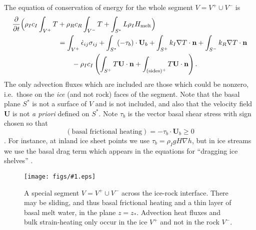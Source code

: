 \documentclass[12pt,final]{amsart}%
\theoremstyle{plain}
\theoremstyle{definition}
\theoremstyle{remark}
\newcommand{\regfigure}[2]{\texttt{[image: figs/\#1.eps]}}
\newcommand{\ddt}[1]{\ensuremath{\frac{\partial #1}{\partial t}}}
\def\eps{\epsilon}
\newcommand{\grad}{\nabla}
\newcommand{\nhat}{\mathbf{n}}
\newcommand{\bU}{{\mathbf{U}}}
\begin{document}
The equation of conservation of energy for the whole segment $V=V^+\cup V^-$ is
\begin{align}
\ddt{}\Big(\rho_I c_I \int_{V^+} T &+ \rho_R c_R \int_{V^-} T + \int_{S^\ast} L \rho_I H_{\text{melt}}\Big) \label{acrossINTERFACE} \\
    &= \int_{V^+} \dot \eps_{ij} \sigma_{ij} + \int_{S^\ast} (-\tau_b) \cdot \bU_b + \int_{S^+} k_I \grad T \cdot \nhat + \int_{S^-} k_R \grad T \cdot \nhat \notag\\
    &\qquad - \rho_I c_I\left(\int_{S^+} T \bU\cdot \nhat + \int_{(\text{sides})^+} T \bU\cdot \nhat\right).\notag
\end{align}
The only advection fluxes which are included are those which could be nonzero, i.e.~those on the \emph{ice} (and not rock) faces of the segment.  Note that the basal plane $S^\ast$ is not a surface of $V$ and is not included, and also that the velocity field $\bU$ is not \emph{a priori} defined on $S^\ast$.  Note $\tau_b$ is the vector basal shear stress with sign chosen so that
    $$(\text{basal frictional heating}) = -\tau_b \cdot \bU_b \ge 0$$
\citep[chapter 10]{Paterson}.  For instance, at inland ice sheet points we use $\tau_b = \rho_I g H \grad h$, but in ice streams we use the basal drag term which appears in the equations for ``dragging ice shelves'' \citep[i.e.~the equations from][]{MacAyeal}.

\begin{figure}[ht]
\regfigure{interfacesegment}{3.5}
\vspace{-0.1in}
\caption{A special segment $V=V^+\cup V^-$ across the ice-rock interface.  There may be sliding, and thus basal frictional heating and a thin layer of basal melt water, in the plane $z=z_\ast$.  Advection heat fluxes and bulk strain-heating only occur in the ice $V^+$ and not in the rock $V^-$.}
\label{fig:segINTERFACE}
\vspace{-0.1in}
\end{figure}
\end{document}
